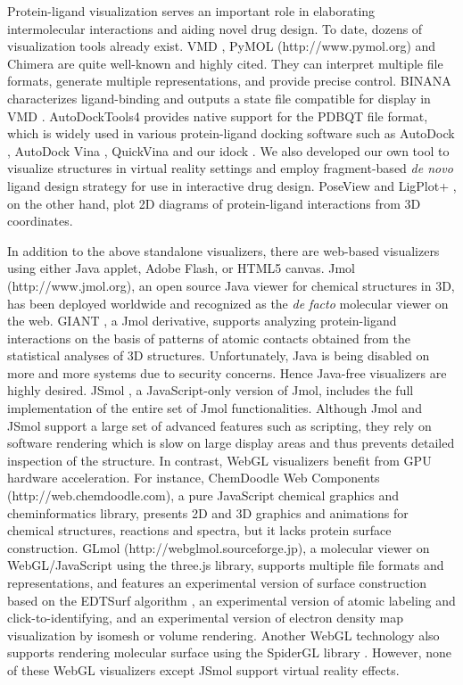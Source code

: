 Protein-ligand visualization serves an important role in elaborating intermolecular interactions and aiding novel drug design. To date, dozens of visualization tools already exist. VMD \citep{1220}, PyMOL (http://www.pymol.org) and Chimera \citep{1219} are quite well-known and highly cited. They can interpret multiple file formats, generate multiple representations, and provide precise control. BINANA \citep{1413} characterizes ligand-binding and outputs a state file compatible for display in VMD \citep{1220}. AutoDockTools4 \citep{596} provides native support for the PDBQT file format, which is widely used in various protein-ligand docking software such as AutoDock \citep{596}, AutoDock Vina \citep{595}, QuickVina \citep{1193} and our idock \citep{1153}. We also developed our own tool \citep{1265} to visualize structures in virtual reality settings and employ fragment-based \textit{de novo} ligand design strategy for use in interactive drug design. PoseView \citep{748} and LigPlot+ \citep{951}, on the other hand, plot 2D diagrams of protein-ligand interactions from 3D coordinates.

In addition to the above standalone visualizers, there are web-based visualizers using either Java applet, Adobe Flash, or HTML5 canvas. Jmol (http://www.jmol.org), an open source Java viewer for chemical structures in 3D, has been deployed worldwide and recognized as the \textit{de facto} molecular viewer on the web. GIANT \citep{1359}, a Jmol derivative, supports analyzing protein-ligand interactions on the basis of patterns of atomic contacts obtained from the statistical analyses of 3D structures. Unfortunately, Java is being disabled on more and more systems due to security concerns. Hence Java-free visualizers are highly desired. JSmol \citep{1314}, a JavaScript-only version of Jmol, includes the full implementation of the entire set of Jmol functionalities. Although Jmol and JSmol support a large set of advanced features such as scripting, they rely on software rendering which is slow on large display areas and thus prevents detailed inspection of the structure. In contrast, WebGL visualizers benefit from GPU hardware acceleration. For instance, ChemDoodle Web Components (http://web.chemdoodle.com), a pure JavaScript chemical graphics and cheminformatics library, presents 2D and 3D graphics and animations for chemical structures, reactions and spectra, but it lacks protein surface construction. GLmol (http://webglmol.sourceforge.jp), a molecular viewer on WebGL/JavaScript using the three.js library, supports multiple file formats and representations, and features an experimental version of surface construction based on the EDTSurf algorithm \citep{1297,1350}, an experimental version of atomic labeling and click-to-identifying, and an experimental version of electron density map visualization by isomesh or volume rendering. Another WebGL technology \citep{1262} also supports rendering molecular surface using the SpiderGL library \citep{1320}. However, none of these WebGL visualizers except JSmol support virtual reality effects.

